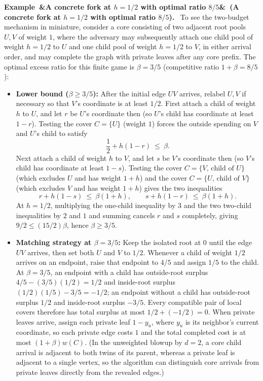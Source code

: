\documentclass[11pt,letterpaper]{article}
\newenvironment{example}[1][]{\refstepcounter{lemma}\par\medskip\noindent\textbf{Example~\thelemma\ifx&#1&\else\ (#1)\fi.}\ \ignorespaces}{\par\medskip}
\begin{document}
\begin{example}[A concrete fork at $h=1/2$ with optimal ratio $8/5$]\label{ex:fork}
To see the two-budget mechanism in miniature, consider a core consisting of two adjacent root pools $U,V$ of weight $1$, where the adversary may subsequently attach one child pool of weight $h=1/2$ to $U$ and one child pool of weight $h=1/2$ to $V$, in either arrival order, and may complete the graph with private leaves after any core prefix. The optimal excess ratio for this finite game is $\beta=3/5$ (competitive ratio $1+\beta=8/5$):
\begin{itemize}
\item \textbf{Lower bound ($\beta\ge 3/5$):} After the initial edge $UV$ arrives, relabel $U,V$ if necessary so that $V$'s coordinate is at least $1/2$. First attach a child of weight $h$ to $U$, and let $r$ be $U$'s coordinate then (so $U$'s child has coordinate at least $1-r$). Testing the cover $C=\{U\}$ (weight $1$) forces the outside spending on $V$ and $U$'s child to satisfy
\[
  \frac12 + h(1-r)\ \le\ \beta .
\]
Next attach a child of weight $h$ to $V$, and let $s$ be $V$'s coordinate then (so $V$'s child has coordinate at least $1-s$). Testing the cover $C=\{V,\,\text{child of }U\}$ (which excludes $U$ and has weight $1+h$) and the cover $C=\{U,\,\text{child of }V\}$ (which excludes $V$ and has weight $1+h$) gives the two inequalities
\[
  r + h(1-s)\ \le\ \beta(1+h),\qquad s + h(1-r)\ \le\ \beta(1+h).
\]
At $h=1/2$, multiplying the one-child inequality by $3$ and the two two-child inequalities by $2$ and $1$ and summing cancels $r$ and $s$ completely, giving $9/2\le (15/2)\beta$, hence $\beta\ge 3/5$.
\item \textbf{Matching strategy at $\beta=3/5$:} Keep the isolated root at $0$ until the edge $UV$ arrives, then set both $U$ and $V$ to $1/2$. Whenever a child of weight $1/2$ arrives on an endpoint, raise that endpoint to $4/5$ and assign $1/5$ to the child. At $\beta=3/5$, an endpoint with a child has outside-root surplus $4/5 - (3/5)(1/2) = 1/2$ and inside-root surplus $(1/2)(1/5) - 3/5 = -1/2$; an endpoint without a child has outside-root surplus $1/2$ and inside-root surplus $-3/5$. Every compatible pair of local covers therefore has total surplus at most $1/2 + (-1/2) = 0$. When private leaves arrive, assign each private leaf $1-y_u$, where $y_u$ is its neighbor's current coordinate, so each private edge costs $1$ and the total completed cost is at most $(1+\beta)w(C)$. (In the unweighted blowup by $d=2$, a core child arrival is adjacent to both twins of its parent, whereas a private leaf is adjacent to a single vertex, so the algorithm can distinguish core arrivals from private leaves directly from the revealed edges.)
\end{itemize}
\end{example}
\end{document}
